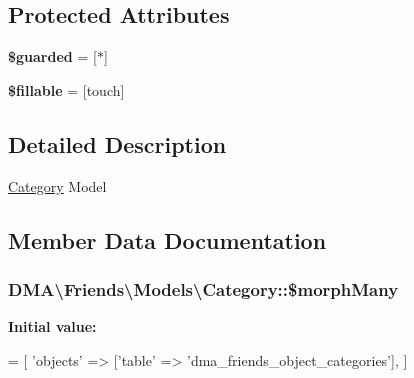 \subsection*{Protected Attributes}
\begin{DoxyCompactItemize}
\item 
\hypertarget{classDMA_1_1Friends_1_1Models_1_1Category_aa3d19857f5a9bdf8be035d38d81a674b}{}{\bfseries \$guarded} = \mbox{[}\textquotesingle{}$\ast$\textquotesingle{}\mbox{]}\label{classDMA_1_1Friends_1_1Models_1_1Category_aa3d19857f5a9bdf8be035d38d81a674b}

\item 
\hypertarget{classDMA_1_1Friends_1_1Models_1_1Category_a2394991fde438a2f76dc8795d6ad8f5a}{}{\bfseries \$fillable} = \mbox{[}\textquotesingle{}touch\textquotesingle{}\mbox{]}\label{classDMA_1_1Friends_1_1Models_1_1Category_a2394991fde438a2f76dc8795d6ad8f5a}

\end{DoxyCompactItemize}


\subsection{Detailed Description}
\hyperlink{classDMA_1_1Friends_1_1Models_1_1Category}{Category} Model 

\subsection{Member Data Documentation}
\hypertarget{classDMA_1_1Friends_1_1Models_1_1Category_a50575142a249c510106a75d42b71391b}{}
\subsubsection[{\$morph\+Many}]{\setlength{\rightskip}{0pt plus 5cm}D\+M\+A\textbackslash{}\+Friends\textbackslash{}\+Models\textbackslash{}\+Category\+::\$morph\+Many}\label{classDMA_1_1Friends_1_1Models_1_1Category_a50575142a249c510106a75d42b71391b}
{\bfseries Initial value\+:}
\begin{DoxyCode}
= [ 
        \textcolor{stringliteral}{'objects'} => [\textcolor{stringliteral}{'table'} => \textcolor{stringliteral}{'dma\_friends\_object\_categories'}],
    ]
\end{DoxyCode}
\hypertarget{classDMA_1_1Friends_1_1Models_1_1Category_ad99b16f55603d86e0a22fa60c22c7300}{}
